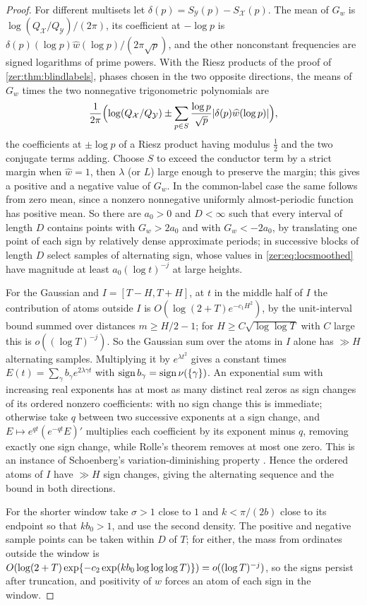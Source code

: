 \begin{proof}
For different multisets let $\delta(p)=S_{\mathcal Y}(p)-S_{\mathcal X}(p)$. The mean of $G_w$ is
$\log(Q_{\mathcal X}/Q_{\mathcal Y})/(2\pi)$, its coefficient at $-\log p$ is
$\delta(p)(\log p)\widehat w(\log p)/(2\pi\sqrt p)$, and the other nonconstant frequencies are signed
logarithms of prime powers. With the Riesz products of the proof of \cref{zer:thm:blindlabels}, phases
chosen in the two opposite directions, the means of $G_w$ times the two nonnegative trigonometric
polynomials are
\[
 \frac1{2\pi}\Bigl(\log(Q_{\mathcal X}/Q_{\mathcal Y})\pm\sum_{p\in S}\frac{\log p}{\sqrt p}\lvert\delta(p)\widehat w(\log p)\rvert\Bigr),
\]
the coefficients at $\pm\log p$ of a Riesz product having modulus $\tfrac12$ and the two conjugate terms
adding. Choose $S$ to exceed the conductor term by a strict margin when $\widehat w=1$, then $\lambda$ (or
$L$) large enough to preserve the margin; this gives a positive and a negative value of $G_w$. In the
common-label case the same follows from zero mean, since a nonzero nonnegative uniformly almost-periodic
function has positive mean. So there are $a_0>0$ and $D<\infty$ such that every interval of length $D$
contains points with $G_w>2a_0$ and with $G_w<-2a_0$, by translating one point of each sign by relatively
dense approximate periods; in successive blocks of length $D$ select samples of alternating sign, whose
values in \eqref{zer:eq:locsmoothed} have magnitude at least $a_0(\log t)^{-j}$ at large heights.

For the Gaussian and $I=[T-H,T+H]$, at $t$ in the middle half of $I$ the contribution of atoms outside $I$ is
$O(\log(2+T)e^{-c_1H^2})$, by the unit-interval bound summed over distances $m\ge H/2-1$; for
$H\ge C\sqrt{\log\log T}$ with $C$ large this is $o((\log T)^{-j})$. So the Gaussian sum over the atoms in
$I$ alone has $\gg H$ alternating samples. Multiplying it by $e^{\lambda t^2}$ gives a constant times
$E(t)=\sum_\gamma b_\gamma e^{2\lambda\gamma t}$ with $\operatorname{sign}b_\gamma=\operatorname{sign}\nu(\{\gamma\})$.
An exponential sum with increasing real exponents has at most as many distinct real zeros as sign changes
of its ordered nonzero coefficients: with no sign change this is immediate; otherwise take $q$ between two
successive exponents at a sign change, and $E\mapsto e^{qt}(e^{-qt}E)'$ multiplies each coefficient by its
exponent minus $q$, removing exactly one sign change, while Rolle's theorem removes at most one zero. This
is an instance of Schoenberg's variation-diminishing property \cite{Schoenberg1948Variation}. Hence the
ordered atoms of $I$ have $\gg H$ sign changes, giving the alternating sequence and the bound in both
directions.

For the shorter window take $\sigma>1$ close to $1$ and $k<\pi/(2b)$ close to its endpoint so that
$kb_0>1$, and use the second density. The positive and negative sample points can be taken within $D$ of
$T$; for either, the mass from ordinates outside the window is
$O(\log(2+T)\exp\{-c_2\exp(kb_0\log\log\log T)\})=o((\log T)^{-j})$, so the signs persist after
truncation, and positivity of $w$ forces an atom of each sign in the window.
\end{proof}

